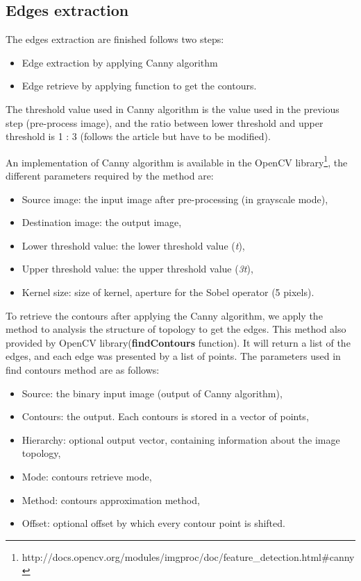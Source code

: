 \subsection{Edges extraction}
The edges extraction are finished follows two steps:
\begin{itemize}
\item Edge extraction by applying Canny algorithm
\item Edge retrieve by applying function to get the contours.
\end{itemize} 
The threshold value used in Canny algorithm is the value used in the previous step (pre-process image), and the ratio between lower threshold and upper threshold is 1 : 3 (follows the article \cite{palaniswamy2010automatic} but have to be modified).

 
An implementation of Canny algorithm is available in the OpenCV library\footnote{http://docs.opencv.org/modules/imgproc/doc/feature\_detection.html\#canny}, the different parameters required by the method are:
\begin{itemize}
\item Source image: the input image after pre-processing (in grayscale mode),
\item Destination image: the output image,
\item Lower threshold value: the lower threshold value (\textit{t}),
\item Upper threshold value: the upper threshold value (\textit{3t}),
\item Kernel size: size of kernel, aperture for the Sobel operator (5 pixels).
\end{itemize}
To retrieve the contours after applying the Canny algorithm, we apply the method to analysis the structure of topology to get the edges. This method also provided by OpenCV library(\textbf{findContours} function). It will return a list of the edges, and each edge was presented by a list of points. 
The parameters used in find contours method are as follows:
\begin{itemize}
\item Source: the binary input image (output of Canny algorithm),
\item Contours: the output. Each contours is stored in a vector of points,
\item Hierarchy: optional output vector, containing information about the image topology,
\item Mode: contours retrieve mode,
\item Method: contours approximation method,
\item Offset: optional offset by which every contour point is shifted.
\end{itemize}
